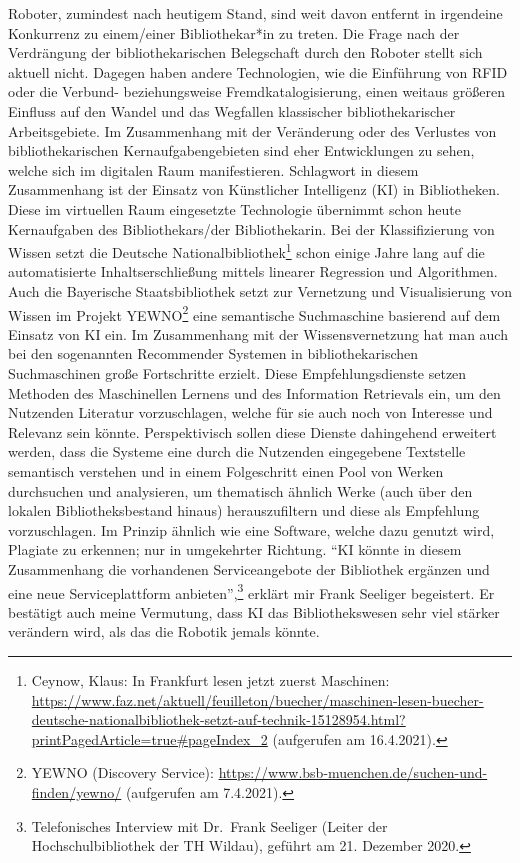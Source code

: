 \documentclass[a4paper,
fontsize=11pt,
oneside,
numbers=noperiodatend,
parskip=half-,
bibliography=totoc,
final
]{scrartcl}
\begin{document}
Roboter, zumindest nach heutigem Stand, sind weit davon entfernt in
irgendeine Konkurrenz zu einem/einer Bibliothekar*in zu treten. Die
Frage nach der Verdrängung der bibliothekarischen Belegschaft durch den
Roboter stellt sich aktuell nicht. Dagegen haben andere Technologien,
wie die Einführung von RFID oder die Verbund- beziehungsweise
Fremdkatalogisierung, einen weitaus größeren Einfluss auf den Wandel und
das Wegfallen klassischer bibliothekarischer Arbeitsgebiete. Im
Zusammenhang mit der Veränderung oder des Verlustes von
bibliothekarischen Kernaufgabengebieten sind eher Entwicklungen zu
sehen, welche sich im digitalen Raum manifestieren. Schlagwort in diesem
Zusammenhang ist der Einsatz von Künstlicher Intelligenz (KI) in
Bibliotheken. Diese im virtuellen Raum eingesetzte Technologie übernimmt
schon heute Kernaufgaben des Bibliothekars/der Bibliothekarin. Bei der
Klassifizierung von Wissen setzt die Deutsche Nationalbibliothek\footnote{Ceynow, Klaus: In
  Frankfurt lesen jetzt zuerst Maschinen:
  \url{https://www.faz.net/aktuell/feuilleton/buecher/maschinen-lesen-buecher-deutsche-nationalbibliothek-setzt-auf-technik-15128954.html?printPagedArticle=true\#pageIndex_2}
  (aufgerufen am 16.4.2021).} schon einige Jahre lang auf die
automatisierte Inhaltserschließung mittels linearer Regression und
Algorithmen. Auch die Bayerische Staatsbibliothek setzt zur Vernetzung
und Visualisierung von Wissen im Projekt YEWNO\footnote{YEWNO (Discovery
  Service): \url{https://www.bsb-muenchen.de/suchen-und-finden/yewno/}
  (aufgerufen am 7.4.2021).} eine semantische Suchmaschine basierend auf
dem Einsatz von KI ein. Im Zusammenhang mit der Wissensvernetzung hat
man auch bei den sogenannten Recommender Systemen in bibliothekarischen
Suchmaschinen große Fortschritte erzielt. Diese Empfehlungsdienste
setzen Methoden des Maschinellen Lernens und des Information Retrievals
ein, um den Nutzenden Literatur vorzuschlagen, welche für sie auch noch
von Interesse und Relevanz sein könnte. Perspektivisch sollen diese
Dienste dahingehend erweitert werden, dass die Systeme eine durch die
Nutzenden eingegebene Textstelle semantisch verstehen und in einem
Folgeschritt einen Pool von Werken durchsuchen und analysieren, um
thematisch ähnlich Werke (auch über den lokalen Bibliotheksbestand
hinaus) herauszufiltern und diese als Empfehlung vorzuschlagen. Im Prinzip
ähnlich wie eine Software, welche dazu genutzt wird, Plagiate zu
erkennen; nur in umgekehrter Richtung. \enquote{KI könnte in diesem
Zusammenhang die vorhandenen Serviceangebote der Bibliothek ergänzen und
eine neue Serviceplattform anbieten},\footnote{Telefonisches Interview
  mit Dr.~Frank Seeliger (Leiter der Hochschulbibliothek der TH Wildau),
  geführt am 21. Dezember 2020.} erklärt mir Frank Seeliger begeistert.
Er bestätigt auch meine Vermutung, dass KI das Bibliothekswesen sehr
viel stärker verändern wird, als das die Robotik jemals könnte.
\end{document}
